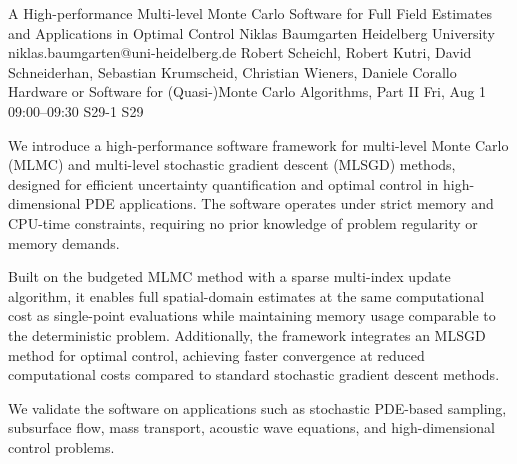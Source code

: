 \documentclass[12pt,lettersize,oneside]{book} %
\begin{document}
\begin{talk}
  {A High-performance Multi-level Monte Carlo Software for Full Field Estimates and Applications in Optimal Control}%
  {Niklas Baumgarten}%
  {Heidelberg University}%
  {niklas.baumgarten@uni-heidelberg.de}%
  {Robert Scheichl, Robert Kutri, David Schneiderhan, Sebastian Krumscheid, Christian Wieners, Daniele Corallo}%
  {Hardware or Software for (Quasi-)Monte Carlo Algorithms, Part II}%
  {Fri, Aug 1 09:00--09:30}%
  {S29-1}%
  {S29}%


We introduce a high-performance software framework for multi-level Monte Carlo (MLMC)
and multi-level stochastic gradient descent (MLSGD) methods,
designed for efficient uncertainty quantification and optimal control in high-dimensional PDE applications.
The software operates under strict memory and CPU-time constraints,
requiring no prior knowledge of problem regularity or memory demands.

Built on the budgeted MLMC method with a sparse multi-index update algorithm,
it enables full spatial-domain estimates at the same computational cost as single-point
evaluations while maintaining memory usage comparable to the deterministic problem.
Additionally, the framework integrates an MLSGD method for optimal control,
achieving faster convergence at reduced computational costs compared to standard
stochastic gradient descent methods.

We validate the software on applications such as stochastic PDE-based sampling, subsurface flow,
mass transport, acoustic wave equations, and high-dimensional control problems.


\end{talk}
\end{document}
